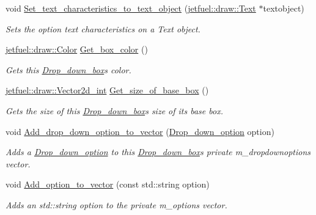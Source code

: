 \begin{DoxyCompactItemize}
void \hyperlink{classjetfuel_1_1gui_1_1Drop__down__box_ad8df2088af8ede79c0747e89647b060d}{Set\+\_\+text\+\_\+characteristics\+\_\+to\+\_\+text\+\_\+object} (\hyperlink{classjetfuel_1_1draw_1_1Text}{jetfuel\+::draw\+::\+Text} $\ast$textobject)
\begin{DoxyCompactList}\small\item\em Sets the option text characteristics on a Text object. \end{DoxyCompactList}\item 
\hyperlink{classjetfuel_1_1draw_1_1Color}{jetfuel\+::draw\+::\+Color} \hyperlink{classjetfuel_1_1gui_1_1Drop__down__box_a2635b1bb1d02c27bafbb91c03d312d91}{Get\+\_\+box\+\_\+color} ()
\begin{DoxyCompactList}\small\item\em Gets this \hyperlink{classjetfuel_1_1gui_1_1Drop__down__box}{Drop\+\_\+down\+\_\+box}\textquotesingle{}s color. \end{DoxyCompactList}\item 
\hyperlink{classjetfuel_1_1draw_1_1Vector2d}{jetfuel\+::draw\+::\+Vector2d\+\_\+int} \hyperlink{classjetfuel_1_1gui_1_1Drop__down__box_afc436e723fe796f9d85a6332252e35c4}{Get\+\_\+size\+\_\+of\+\_\+base\+\_\+box} ()
\begin{DoxyCompactList}\small\item\em Gets the size of this \hyperlink{classjetfuel_1_1gui_1_1Drop__down__box}{Drop\+\_\+down\+\_\+box}\textquotesingle{}s size of it\textquotesingle{}s base box. \end{DoxyCompactList}\item 
void \hyperlink{classjetfuel_1_1gui_1_1Drop__down__box_a7b1288e66e0276829df981a4c7a07081}{Add\+\_\+drop\+\_\+down\+\_\+option\+\_\+to\+\_\+vector} (\hyperlink{structjetfuel_1_1gui_1_1Drop__down__box_1_1Drop__down__option}{Drop\+\_\+down\+\_\+option} option)
\begin{DoxyCompactList}\small\item\em Adds a \hyperlink{structjetfuel_1_1gui_1_1Drop__down__box_1_1Drop__down__option}{Drop\+\_\+down\+\_\+option} to this \hyperlink{classjetfuel_1_1gui_1_1Drop__down__box}{Drop\+\_\+down\+\_\+box}\textquotesingle{}s private m\+\_\+dropdownoptions vector. \end{DoxyCompactList}\item 
void \hyperlink{classjetfuel_1_1gui_1_1Drop__down__box_a5ed3ca41e8d6147e3af3afc94c8b8f1a}{Add\+\_\+option\+\_\+to\+\_\+vector} (const std\+::string option)
\begin{DoxyCompactList}\small\item\em Adds an std\+::string option to the private m\+\_\+options vector. \end{DoxyCompactList}\item 

\end{DoxyCompactItemize}
